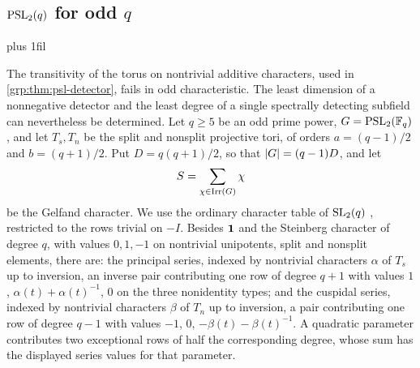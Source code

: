 
\subsection{\texorpdfstring{$\operatorname{PSL}_2(q)$}{PSL2(q)} for odd \texorpdfstring{$q$}{q}}\label{grp:sec:psl-odd}
{\rightskip=0pt plus 1fil\relax
{}
}

The transitivity of the torus on nontrivial additive characters, used in
\cref{grp:thm:psl-detector}, fails in odd characteristic. The least dimension
of a nonnegative detector and the least degree of a single spectrally
detecting subfield can nevertheless be determined. Let $q\ge5$ be an odd prime
power, $G=\operatorname{PSL}_2(\mathbb{F}_q)$, and let $T_s,T_n$ be the split and nonsplit projective
tori, of orders $a=(q-1)/2$ and $b=(q+1)/2$. Put $D=q(q+1)/2$, so that
$\lvert G\rvert=(q-1)D$, and let
\[
 S=\sum_{\chi\in\operatorname{Irr}(G)}\chi
\]
be the Gelfand character. We use the ordinary character table of
$\operatorname{SL}_2(q)$ \cite[Table~1]{BohmlerFarrellLassueur2022Trivial}, restricted to
the rows trivial on $-I$. Besides $\mathbf{1}$ and the Steinberg character of
degree $q$, with values $0,1,-1$ on nontrivial unipotents, split and nonsplit
elements, there are: the principal series, indexed by nontrivial characters
$\alpha$ of $T_s$ up to inversion, an inverse pair contributing one row of
degree $q+1$ with values $1$, $\alpha(t)+\alpha(t)^{-1}$, $0$ on the three
nonidentity types; and the cuspidal series, indexed by nontrivial characters
$\beta$ of $T_n$ up to inversion, a pair contributing one row of degree $q-1$
with values $-1$, $0$, $-\beta(t)-\beta(t)^{-1}$. A quadratic parameter
contributes two exceptional rows of half the corresponding degree, whose sum
has the displayed series values for that parameter.

